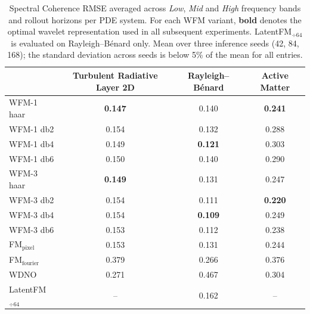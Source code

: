 \begin{table}[ht]
\centering
\caption{Spectral Coherence RMSE averaged across \textit{Low}, \textit{Mid} and \textit{High} frequency bands and rollout horizons per PDE system. For each WFM variant, \textbf{bold} denotes the optimal wavelet representation used in all subsequent experiments. LatentFM$_{\div 64}$ is evaluated on Rayleigh--B\'enard only. Mean over three inference seeds (42, 84, 168); the standard deviation across seeds is below 5\% of the mean for all entries.}
\label{tab:avg_sc_rmse_gen_wavelets}
\begin{tabular}{lccc}
\toprule
 & Turbulent Radiative Layer 2D & Rayleigh--B\'{e}nard & Active Matter \\
\midrule
WFM-1 haar & \textbf{0.147} & 0.140 & \textbf{0.241} \\
WFM-1 db2 & 0.154 & 0.132 & 0.288 \\
WFM-1 db4 & 0.149 & \textbf{0.121} & 0.303 \\
WFM-1 db6 & 0.150 & 0.140 & 0.290 \\
\midrule
WFM-3 haar & \textbf{0.149} & 0.131 & 0.247 \\
WFM-3 db2 & 0.154 & 0.111 & \textbf{0.220} \\
WFM-3 db4 & 0.154 & \textbf{0.109} & 0.249 \\
WFM-3 db6 & 0.153 & 0.112 & 0.238 \\
\midrule
FM$_\text{pixel}$ & 0.153 & 0.131 & 0.244 \\
FM$_\text{fourier}$ & 0.379 & 0.266 & 0.376 \\
WDNO & 0.271 & 0.467 & 0.304 \\
LatentFM$_{\div 64}$ & -- & 0.162 & -- \\
\bottomrule
\end{tabular}
\end{table}
